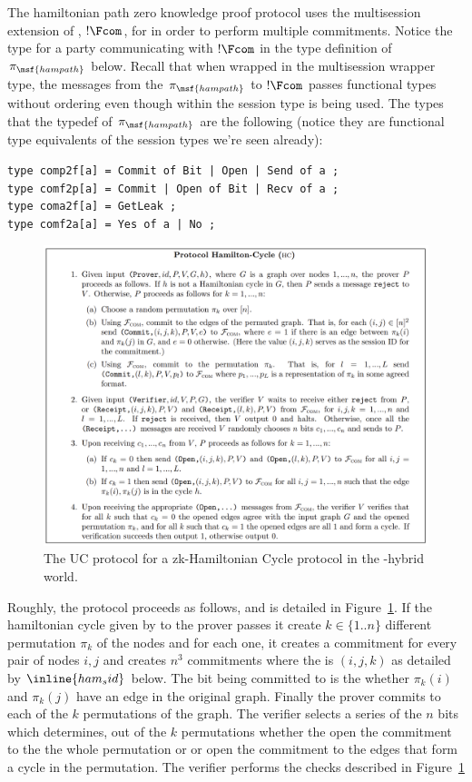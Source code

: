 The hamiltonian path zero knowledge proof protocol uses the multisession extension of \Fcom, $!\Fcom$,
for in order to perform multiple commitments. Notice the type for a party communicating with $!\Fcom$ in 
the type definition of $\pi_\msf{hampath}$ below.
Recall that when wrapped in the multisession wrapper type, the messages from the $\pi_\msf{hampath}$ to $!\Fcom$
passes functional types without ordering even though within \Fcom the session type is being used.
The types that the typedef of $\pi_\msf{hampath}$ are the following (notice they are functional type equivalents of the session types we're seen already):
\begin{lstlisting}[basicstyle=\footnotesize\BeraMonottFamily, frame=single, mathescape]
type comp2f[a] = Commit of Bit | Open | Send of a ;
type comf2p[a] = Commit | Open of Bit | Recv of a ;
type coma2f[a] = GetLeak ;
type comf2a[a] = Yes of a | No ;
\end{lstlisting}

\begin{figure}
\centering
\includegraphics[scale=0.25]{figures/hampathprot.png}
\caption{The UC protocol for a zk-Hamiltonian Cycle protocol in the \Fcom-hybrid world.}
\label{fig:hampathzk}
\end{figure}

Roughly, the protocol proceeds as follows, and is detailed in Figure~\ref{fig:hampathzk}.
If the hamiltonian cycle given by \Z to the prover passes  it create $k \in \{1..n\}$ different
permutation $\pi_k$ of the nodes and for each one, it creates a commitment for every pair of nodes $i,j$ and creates $n^3$ commitments
where the  is $(i,j,k)$ as detailed by $\inline{ham_sid}$ below. The bit being committed to
is the whether $\pi_k(i)$ and $\pi_k(j)$ have an edge in the original graph. 
Finally the prover commits to each of the $k$ permutations of the graph.  
The verifier selects a series of the $n$ bits which determines, out of the $k$ permutations whether
the open the commitment to the the whole permutation or or open the commitment to the edges that form a cycle
in the permutation. 
The verifier performs the checks described in Figure~\ref{fig:hampathzk}


